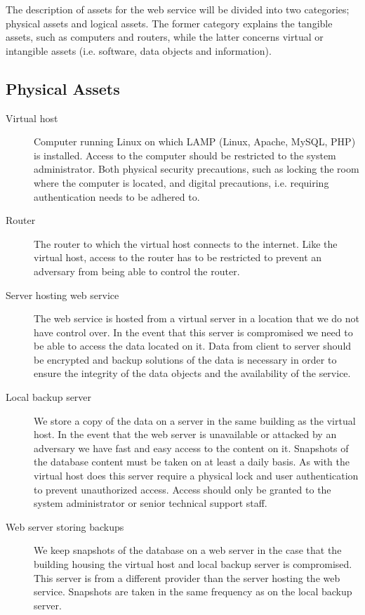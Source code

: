 \documentclass{article}
\begin{document}
The description of assets for the web service will be divided into two categories; physical assets and logical assets. The former category explains the tangible assets, such as computers and routers, while the latter concerns virtual or intangible assets (i.e. software, data objects and information). 


\subsection*{Physical Assets}


\begin{description}
\item[Virtual host] 
Computer running Linux on which LAMP (Linux, Apache, MySQL, PHP) is installed. 
Access to the computer should be restricted to the system administrator. 
Both physical security precautions, such as locking the room where the computer is located, and digital precautions, 
i.e. requiring authentication needs to be adhered to.
 
\item[Router] 
The router to which the virtual host connects to the internet. 
Like the virtual host, access to the router has to be restricted to prevent an adversary from being able to control the router. 

\item[Server hosting web service] 
The web service is hosted from a virtual server in a location that we do not have control over. 
In the event that this server is compromised we need to be able to access the data located on it. 
Data from client to server should be encrypted and backup solutions of the data is necessary 
in order to ensure the integrity of the data objects and the availability of the service. 
 
\item[Local backup server]
We store a copy of the data on a server in the same building as the virtual host. 
In the event that the web server is unavailable or attacked by an adversary we have fast and easy access to the content on it. 
Snapshots of the database content must be taken on at least a daily basis.  
As with the virtual host does this server require a physical lock and user authentication to prevent unauthorized access. 
Access should only be granted to the system administrator or senior technical support staff. 

\item[Web server storing backups]
We keep snapshots of the database on a web server in the case that the building housing the virtual host and local backup server is compromised. 
This server is from a different provider than the server hosting the web service. 
Snapshots are taken in the same frequency as on the local backup server. 

\end{description}
	
\end{document}

